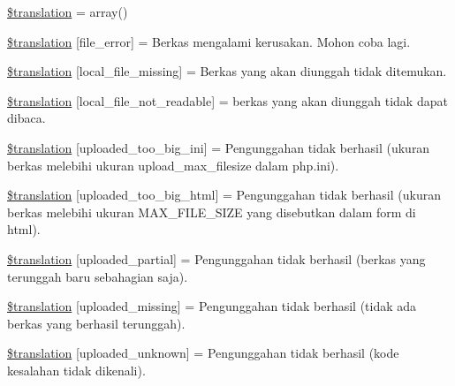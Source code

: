 \begin{DoxyCompactItemize}
\item 
\hyperlink{class_8upload_8id___i_d_8php_a1f198d410fecc3871ebdd468d343a5e3}{\$translation} = array()
\item 
\hyperlink{class_8upload_8id___i_d_8php_ac7498e49b9771b04698029aa61c70821}{\$translation} \mbox{[}\textquotesingle{}file\+\_\+error\textquotesingle{}\mbox{]} = \textquotesingle{}Berkas mengalami kerusakan. Mohon coba lagi.\textquotesingle{}
\item 
\hyperlink{class_8upload_8id___i_d_8php_a6ec3d3a47ab70d77e7aa593e82ead10e}{\$translation} \mbox{[}\textquotesingle{}local\+\_\+file\+\_\+missing\textquotesingle{}\mbox{]} = \textquotesingle{}Berkas yang akan diunggah tidak ditemukan.\textquotesingle{}
\item 
\hyperlink{class_8upload_8id___i_d_8php_a60104befef9b241f3a7a6a755618a4b3}{\$translation} \mbox{[}\textquotesingle{}local\+\_\+file\+\_\+not\+\_\+readable\textquotesingle{}\mbox{]} = \textquotesingle{}berkas yang akan diunggah tidak dapat dibaca.\textquotesingle{}
\item 
\hyperlink{class_8upload_8id___i_d_8php_a6a08dcd0d3651fdd098568f6b2f0a42c}{\$translation} \mbox{[}\textquotesingle{}uploaded\+\_\+too\+\_\+big\+\_\+ini\textquotesingle{}\mbox{]} = \textquotesingle{}Pengunggahan tidak berhasil (ukuran berkas melebihi ukuran upload\+\_\+max\+\_\+filesize dalam php.\+ini).\textquotesingle{}
\item 
\hyperlink{class_8upload_8id___i_d_8php_a623d5b8b92169f57d7e43458aa911cbb}{\$translation} \mbox{[}\textquotesingle{}uploaded\+\_\+too\+\_\+big\+\_\+html\textquotesingle{}\mbox{]} = \textquotesingle{}Pengunggahan tidak berhasil (ukuran berkas melebihi ukuran M\+A\+X\+\_\+\+F\+I\+L\+E\+\_\+\+S\+I\+Z\+E yang disebutkan dalam form di html).\textquotesingle{}
\item 
\hyperlink{class_8upload_8id___i_d_8php_a967c17da21b0a2d3bd65cca3a9ca0ea8}{\$translation} \mbox{[}\textquotesingle{}uploaded\+\_\+partial\textquotesingle{}\mbox{]} = \textquotesingle{}Pengunggahan tidak berhasil (berkas yang terunggah baru sebahagian saja).\textquotesingle{}
\item 
\hyperlink{class_8upload_8id___i_d_8php_a0cce433260be65f1f35853a6b4b8952b}{\$translation} \mbox{[}\textquotesingle{}uploaded\+\_\+missing\textquotesingle{}\mbox{]} = \textquotesingle{}Pengunggahan tidak berhasil (tidak ada berkas yang berhasil terunggah).\textquotesingle{}
\item 
\hyperlink{class_8upload_8id___i_d_8php_a4a9168e922b827e6a28b5db1c00774ca}{\$translation} \mbox{[}\textquotesingle{}uploaded\+\_\+unknown\textquotesingle{}\mbox{]} = \textquotesingle{}Pengunggahan tidak berhasil (kode kesalahan tidak dikenali).\textquotesingle{}

\end{DoxyCompactItemize}

